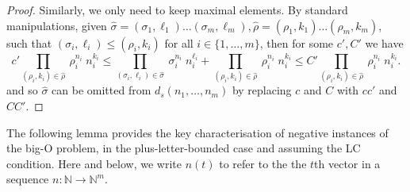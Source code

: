\documentclass[10pt,a4paper]{amsart}
\numberwithin{equation}{section}
\theoremstyle{plain}
\theoremstyle{definition}
\theoremstyle{remark}
\newcommand\dgf{d}
\newcommand\nat[1]{\ensuremath{\{1,\dots,#1\}}}
\begin{document}
\begin{proof}
Similarly, we only need to keep maximal elements. By standard manipulations, given $\hat{\sigma}=(\sigma_1,\ell_1)\dots(\sigma_m,\ell_m),\hat{\rho}=(\rho_1,k_1)\dots(\rho_m,k_m)$,  such that $(\sigma_i,\ell_i) \le (\rho_i,k_i)$ for all $i\in\nat{m}$, then for some $c',C'$ we have
\[
 c' \prod_{(\rho_i,k_i) \in \hat{\rho}} \ \rho_i^{n_i} \; n_i^{k_i}
 \le \prod_{(\sigma_i,\ell_i) \in \hat{\sigma}} \ \sigma_i^{n_i} \; n_i^{\ell_i}
  + \prod_{(\rho_i,k_i) \in \hat{\rho}} \ \rho_i^{n_i} \; n_i^{k_i}
  \le C' \prod_{(\rho_i,k_i) \in \hat{\rho}} \ \rho_i^{n_i} \; n_i^{k_i}.\] and so  $\hat{\sigma}$ can be omitted from $\dgf_s(n_1,\dots,n_m)$ by replacing $c$ and $C$ with $cc'$ and $CC'$.
\end{proof}

The following lemma provides the key characterisation of negative instances of the big-O problem, in the plus-letter-bounded case and assuming the LC condition. Here and below, we write $n(t)$ to refer to the the $t$th vector in a sequence $n\colon \mathbb{N}\to\mathbb{N}^m$.
\end{document}
